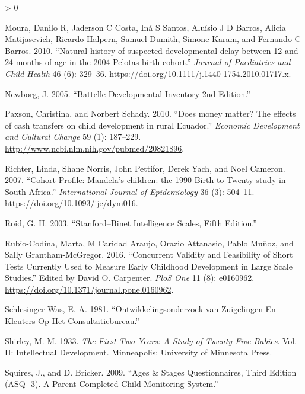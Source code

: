 \documentclass[
]{book}
\newlength{\cslhangindent}
\newenvironment{CSLReferences}[2] %
 {%
  \setlength{\parindent}{0pt}
  \ifodd #1 \everypar{\setlength{\hangindent}{\cslhangindent}}\ignorespaces\fi
  \ifnum #2 > 0
  \setlength{\parskip}{#2\baselineskip}
  \fi
 }%
 {}
\begin{document}
\begin{CSLReferences}{1}{0}
\leavevmode\hypertarget{ref-Moura2010}{}%
Moura, Danilo R, Jaderson C Costa, Iná S Santos, Aluísio J D Barros, Alicia Matijasevich, Ricardo Halpern, Samuel Dumith, Simone Karam, and Fernando C Barros. 2010. {``{Natural history of suspected developmental delay between 12 and 24 months of age in the 2004 Pelotas birth cohort.}''} \emph{Journal of Paediatrics and Child Health} 46 (6): 329--36. \url{https://doi.org/10.1111/j.1440-1754.2010.01717.x}.

\leavevmode\hypertarget{ref-newborg2005}{}%
Newborg, J. 2005. {``Battelle Developmental Inventory-2nd Edition.''}

\leavevmode\hypertarget{ref-Paxson2010}{}%
Paxson, Christina, and Norbert Schady. 2010. {``{Does money matter? The effects of cash transfers on child development in rural Ecuador.}''} \emph{Economic Development and Cultural Change} 59 (1): 187--229. \url{http://www.ncbi.nlm.nih.gov/pubmed/20821896}.

\leavevmode\hypertarget{ref-Richter2007}{}%
Richter, Linda, Shane Norris, John Pettifor, Derek Yach, and Noel Cameron. 2007. {``{Cohort Profile: Mandela's children: the 1990 Birth to Twenty study in South Africa.}''} \emph{International Journal of Epidemiology} 36 (3): 504--11. \url{https://doi.org/10.1093/ije/dym016}.

\leavevmode\hypertarget{ref-roid2003}{}%
Roid, G. H. 2003. {``Stanford--Binet Intelligence Scales, Fifth Edition.''}

\leavevmode\hypertarget{ref-Rubio-Codina2016}{}%
Rubio-Codina, Marta, M Caridad Araujo, Orazio Attanasio, Pablo Muñoz, and Sally Grantham-McGregor. 2016. {``{Concurrent Validity and Feasibility of Short Tests Currently Used to Measure Early Childhood Development in Large Scale Studies.}''} Edited by David O. Carpenter. \emph{PloS One} 11 (8): e0160962. \url{https://doi.org/10.1371/journal.pone.0160962}.

\leavevmode\hypertarget{ref-schlesinger1981}{}%
Schlesinger-Was, E. A. 1981. {``Ontwikkelingsonderzoek van Zuigelingen En Kleuters Op Het Consultatiebureau.''}

\leavevmode\hypertarget{ref-shirley1933}{}%
Shirley, M. M. 1933. \emph{The First Two Years: A Study of Twenty-Five Babies}. Vol. II: Intellectual Development. Minneapolis: University of Minnesota Press.

\leavevmode\hypertarget{ref-squires2009}{}%
Squires, J., and D. Bricker. 2009. {``Ages \& Stages Questionnaires, Third Edition (ASQ- 3). A Parent-Completed Child-Monitoring System.''}


\end{CSLReferences}
\end{document}
